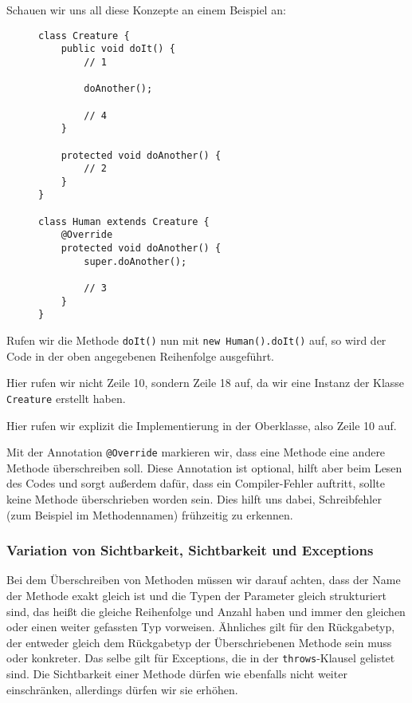 		Schauen wir uns all diese Konzepte an einem Beispiel an:
		\begin{figure}[H]
			\centering
			\begin{lstlisting}
class Creature {
	public void doIt() {
		// 1

		doAnother();

		// 4
	}

	protected void doAnother() {
		// 2
	}
}

class Human extends Creature {
	@Override
	protected void doAnother() {
		super.doAnother();

		// 3
	}
}
\end{lstlisting}
		\end{figure}
		Rufen wir die Methode \lstinline|doIt()| nun mit \lstinline|new Human().doIt()| auf, so wird der Code in der oben angegebenen Reihenfolge ausgeführt.
		\begin{description}[leftmargin = 2cm]
			\item[Zeile 5] Hier rufen wir nicht Zeile 10, sondern Zeile 18 auf, da wir eine Instanz der Klasse \lstinline|Creature| erstellt haben.
			\item[Zeile 17] Hier rufen wir explizit die Implementierung in der Oberklasse, also Zeile 10 auf.
		\end{description}
	
		Mit der Annotation \lstinline|@Override| markieren wir, dass eine Methode eine andere Methode überschreiben soll. Diese Annotation ist optional, hilft aber beim Lesen des Codes und sorgt außerdem dafür, dass ein Compiler-Fehler auftritt, sollte keine Methode überschrieben worden sein. Dies hilft uns dabei, Schreibfehler (zum Beispiel im Methodennamen) frühzeitig zu erkennen. 
	
	\subsubsection{Variation von Sichtbarkeit, Sichtbarkeit und Exceptions}
		Bei dem Überschreiben von Methoden müssen wir darauf achten, dass der Name der Methode exakt gleich ist und die Typen der Parameter gleich strukturiert sind, das heißt die gleiche Reihenfolge und Anzahl haben und immer den gleichen oder einen weiter gefassten Typ vorweisen. Ähnliches gilt für den Rückgabetyp, der entweder gleich dem Rückgabetyp der Überschriebenen Methode sein muss oder konkreter. Das selbe gilt für Exceptions, die in der \lstinline|throws|-Klausel gelistet sind. Die Sichtbarkeit einer Methode dürfen wie ebenfalls nicht weiter einschränken, allerdings dürfen wir sie erhöhen.
		
